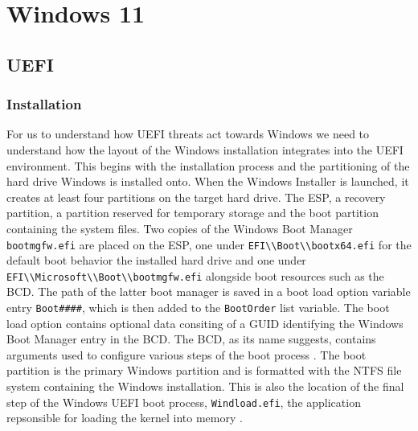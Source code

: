 
\chapter{Windows 11}


\section{\ac{UEFI}}

\subsection{Installation}

For us to understand how UEFI threats act towards Windows we need to understand how the layout of the Windows installation integrates into the UEFI environment.
This begins with the installation process and the partitioning of the hard drive Windows is installed onto.
When the Windows Installer is launched, it creates at least four partitions on the target hard drive.
The \acf{ESP}, a recovery partition, a partition reserved for temporary storage and the boot partition containing the system files.
Two copies of the Windows Boot Manager \lstinline{bootmgfw.efi} are placed on the \ac{ESP}, one under \lstinline{EFI\\Boot\\bootx64.efi} for the default boot behavior the installed hard drive and one under \lstinline{EFI\\Microsoft\\Boot\\bootmgfw.efi} alongside boot resources such as the \ac{BCD}.
The path of the latter boot manager is saved in a boot load option variable entry \lstinline{Boot####}, which is then added to the \lstinline{BootOrder} list variable.
The boot load option contains optional data consiting of a GUID identifying the Windows Boot Manager entry in the \ac{BCD}.
The \ac{BCD}, as its name suggests, contains arguments used to configure various steps of the boot process \cite[12. The Windows Boot Manager]{windows-internals-7-part2}.
The boot partition is the primary Windows partition and is formatted with the \ac{NTFS} file system containing the Windows installation.
This is also the location of the final step of the Windows UEFI boot process, \lstinline{Windload.efi}, the application repsonsible for loading the kernel into memory \cite[12. The Windows OS Loader]{windows-internals-7-part2}.

